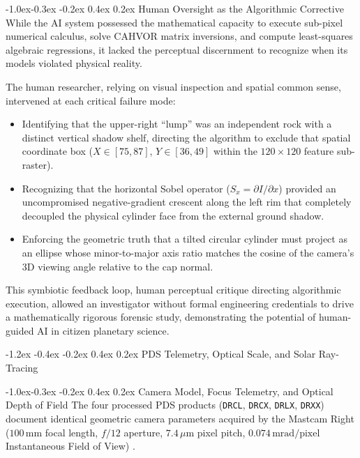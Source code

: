 \documentclass[11pt,a4paper]{article}
\makeatletter
\renewcommand\section{\@startsection {section}{1}{\z@}%
                                   {-1.2ex \@plus -0.4ex \@minus -0.2ex}%
                                   {0.4ex \@plus 0.2ex}%
                                   {\normalfont\large\bfseries}}
\renewcommand\subsection{\@startsection{subsection}{2}{\z@}%
                                     {-1.0ex\@plus -0.3ex \@minus -0.2ex}%
                                     {0.4ex \@plus 0.2ex}%
                                     {\normalfont\normalsize\bfseries}}
\makeatother
\begin{document}
\subsection{Human Oversight as the Algorithmic Corrective}
While the AI system possessed the mathematical capacity to execute sub-pixel numerical calculus, solve CAHVOR matrix inversions, and compute least-squares algebraic regressions, it lacked the perceptual discernment to recognize when its models violated physical reality.

The human researcher, relying on visual inspection and spatial common sense, intervened at each critical failure mode:
\begin{itemize}
	\item Identifying that the upper-right ``lump'' was an independent rock with a distinct vertical shadow shelf, directing the algorithm to exclude that spatial coordinate box ($X \in [75, 87]$, $Y \in [36, 49]$ within the $120 \times 120$ feature sub-raster).
	\item Recognizing that the horizontal Sobel operator ($S_x = \partial I / \partial x$) provided an uncompromised negative-gradient crescent along the left rim that completely decoupled the physical cylinder face from the external ground shadow.
	\item Enforcing the geometric truth that a tilted circular cylinder must project as an ellipse whose minor-to-major axis ratio matches the cosine of the camera's 3D viewing angle relative to the cap normal.
\end{itemize}

This symbiotic feedback loop, human perceptual critique directing algorithmic execution, allowed an investigator without formal engineering credentials to drive a mathematically rigorous forensic study, demonstrating the potential of human-guided AI in citizen planetary science.

\section{PDS Telemetry, Optical Scale, and Solar Ray-Tracing}

\subsection{Camera Model, Focus Telemetry, and Optical Depth of Field}
The four processed PDS products (\texttt{DRCL}, \texttt{DRCX}, \texttt{DRLX}, \texttt{DRXX}) document identical geometric camera parameters acquired by the Mastcam Right ($100\,\text{mm}$ focal length, $f/12$ aperture, $7.4\,\mu\text{m}$ pixel pitch, $0.074\,\text{mrad/pixel}$ Instantaneous Field of View) \cite{malin2017,bell2017,maki2012}.
\end{document}
